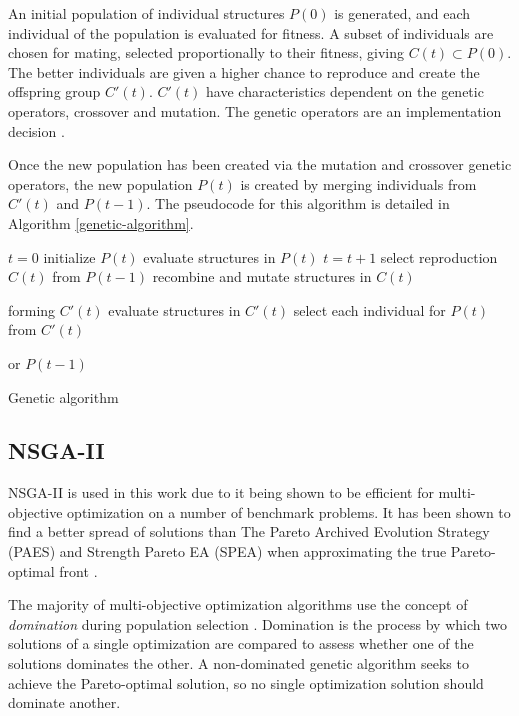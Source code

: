 \documentclass[10pt, conference, compsocconf]{IEEEtran}
\begin{document}
An initial population of individual structures $P(0)$ is generated, and each individual of the population is evaluated for fitness. A subset of individuals are chosen for mating, selected proportionally to their fitness, giving $C(t) \subset P(0)$. The better individuals are given a higher chance to reproduce and create the offspring group $C'(t)$. $C'(t)$ have characteristics dependent on the genetic operators, crossover and mutation. The genetic operators are an implementation decision \cite{FogelDavidB2009}. 

Once the new population has been created via the mutation and crossover genetic operators, the new population $P(t)$ is created by merging individuals from $C'(t)$ and $P(t-1)$. The pseudocode for this algorithm is detailed in Algorithm \ref{genetic-algorithm}.

\begin{algorithm}
\begin{algorithmic}[1]
\State $t=0$
\State initialize $P(t)$
\State evaluate structures in $P(t)$
\State $t=t+1$
\State select reproduction $C(t)$ from $P(t-1)$
\State recombine and mutate structures in $C(t)$

forming $C'(t)$
\State evaluate structures in $C'(t)$
\State select each individual for $P(t)$ from $C'(t)$ 

or $P(t-1)$
\EndWhile
\caption{Genetic algorithm \cite{FogelDavidB2009}}
\label{genetic-algorithm}
\end{algorithmic}
\end{algorithm}

\subsection{NSGA-II}

NSGA-II is used in this work due to it being shown to be efficient for multi-objective optimization on a number of benchmark problems. It has been shown to find a better spread of solutions than The Pareto Archived Evolution Strategy (PAES) \cite{Knowles1999} and Strength Pareto EA (SPEA) \cite{Zitzler2006} when approximating the true Pareto-optimal front \cite{Valkanas2014}.

The majority of multi-objective optimization algorithms use the concept of \emph{domination} during population selection \cite{Burke2014}. Domination is the process by which two solutions of a single optimization are compared to assess whether one of the solutions dominates the other. A non-dominated genetic algorithm seeks to achieve the Pareto-optimal solution, so no single optimization solution should dominate another.
\end{document}
